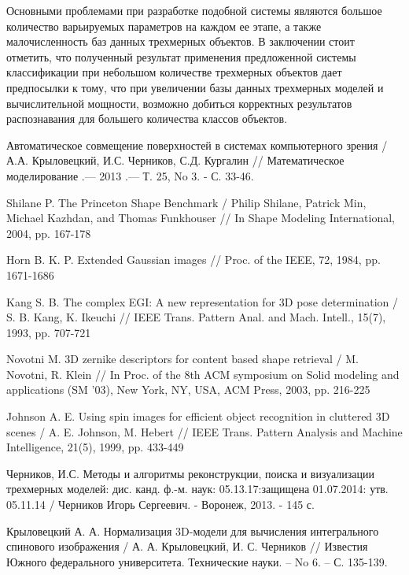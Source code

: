 \documentclass[14pt]{article}
\numberwithin{figure}{section}
\numberwithin{equation}{section}
\begin{document}
Основными проблемами при разработке подобной системы являются большое количество варьируемых параметров на каждом ее этапе, а также малочисленность баз данных трехмерных объектов. В заключении стоит отметить, что полученный результат применения предложенной системы классификации при небольшом количестве трехмерных объектов дает предпосылки к тому, что при увеличении базы данных трехмерных моделей и вычислительной мощности, возможно добиться корректных результатов распознавания для большего количества классов объектов.

\newpage
{}
\begin{thebibliography}{9}

    Автоматическое совмещение поверхностей в системах компьютерного зрения / А.А. Крыловецкий, И.С. Черников, С.Д. Кургалин // Математическое моделирование .— 2013 .— Т. 25, No 3. - С. 33-46.

    Shilane P. The Princeton Shape Benchmark / Philip Shilane, Patrick Min, Michael Kazhdan, and Thomas Funkhouser // In Shape Modeling International, 2004, pp. 167-178

	Horn B. K. P. Extended Gaussian images // Proc. of the IEEE, 72, 1984, pp. 1671-1686

	Kang S. B. The complex EGI: A new representation for 3D pose determination / S. B. Kang, K. Ikeuchi // IEEE Trans. Pattern Anal. and Mach. Intell., 15(7), 1993, pp. 707-721

	Novotni M. 3D zernike descriptors for content based shape retrieval / M. Novotni, R. Klein // In Proc. of the 8th ACM symposium on Solid modeling and applications (SM ’03), New York, NY, USA, ACM Press, 2003, pp. 216-225

    Johnson A. E. Using spin images for efficient object recognition in cluttered 3D scenes / A. E. Johnson, M. Hebert // IEEE Trans. Pattern Analysis and Machine Intelligence, 21(5), 1999, pp. 433-449

    Черников, И.С. Методы и алгоритмы реконструкции, поиска и визуализации трехмерных моделей: дис. канд. ф.-м. наук: 05.13.17:защищена 01.07.2014: утв. 05.11.14 / Черников Игорь Сергеевич. - Воронеж, 2013. - 145 с.

    Крыловецкий А. А. Нормализация 3D-модели для вычисления интегрального спинового изображения / А. А. Крыловецкий, И. С. Черников // Известия Южного федерального университета. Технические науки. – No 6. – С. 135-139.


\end{thebibliography}
\end{document}
